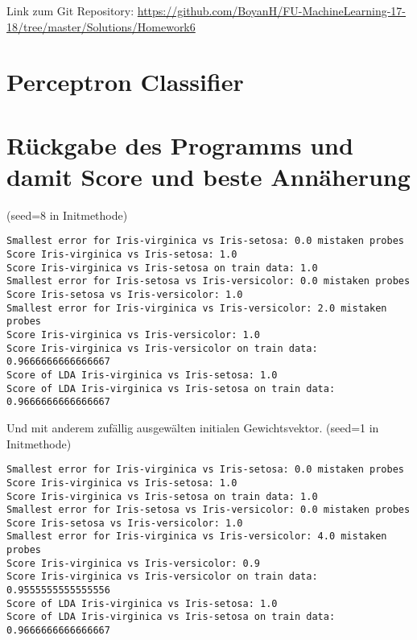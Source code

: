 \usepackage{graphicx}
\usepackage{amsmath}
\usepackage{amssymb}
\usepackage{fancyvrb}

\newcommand{\dozent}{Prof. R. Rojas}					%
\newcommand{\projectNo}{6}
\newcommand{\veranstaltung}{Mustererkennung}
\newcommand{\semester}{WS17/18}
\newcommand{\studenten}{Boyan Hristov, Nedeltscho Petrov}





Link zum Git Repository: \url{https://github.com/BoyanH/FU-MachineLearning-17-18/tree/master/Solutions/Homework\projectNo}

\section*{Perceptron Classifier}


\section*{Rückgabe des Programms und damit Score und beste Annäherung}

(seed=8 in Initmethode)
\begin{lstlisting}
Smallest error for Iris-virginica vs Iris-setosa: 0.0 mistaken probes
Score Iris-virginica vs Iris-setosa: 1.0
Score Iris-virginica vs Iris-setosa on train data: 1.0
Smallest error for Iris-setosa vs Iris-versicolor: 0.0 mistaken probes
Score Iris-setosa vs Iris-versicolor: 1.0
Smallest error for Iris-virginica vs Iris-versicolor: 2.0 mistaken probes
Score Iris-virginica vs Iris-versicolor: 1.0
Score Iris-virginica vs Iris-versicolor on train data: 0.9666666666666667
Score of LDA Iris-virginica vs Iris-setosa: 1.0
Score of LDA Iris-virginica vs Iris-setosa on train data: 0.9666666666666667
\end{lstlisting}

Und mit anderem zufällig ausgewälten initialen Gewichtsvektor. (seed=1 in Initmethode)

\begin{lstlisting}
Smallest error for Iris-virginica vs Iris-setosa: 0.0 mistaken probes
Score Iris-virginica vs Iris-setosa: 1.0
Score Iris-virginica vs Iris-setosa on train data: 1.0
Smallest error for Iris-setosa vs Iris-versicolor: 0.0 mistaken probes
Score Iris-setosa vs Iris-versicolor: 1.0
Smallest error for Iris-virginica vs Iris-versicolor: 4.0 mistaken probes
Score Iris-virginica vs Iris-versicolor: 0.9
Score Iris-virginica vs Iris-versicolor on train data: 0.9555555555555556
Score of LDA Iris-virginica vs Iris-setosa: 1.0
Score of LDA Iris-virginica vs Iris-setosa on train data: 0.9666666666666667
\end{lstlisting}


